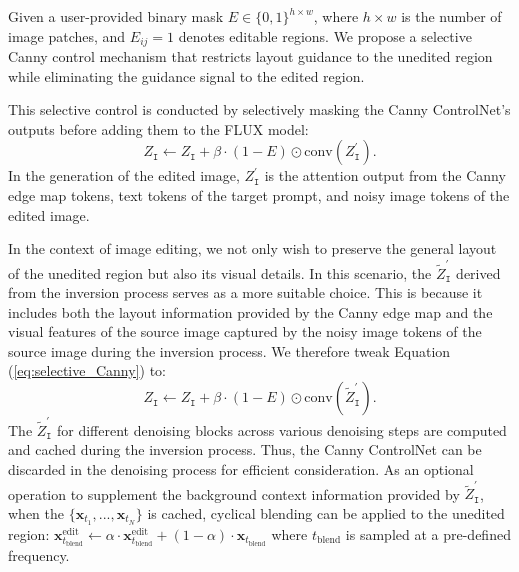 \documentclass{article}
\begin{document}
Given a user-provided binary mask \( E \in \{0,1\}^{h \times w} \), where $h \times w$ is the number of image patches, and \( E_{ij} = 1 \) denotes editable regions.  We propose a selective Canny control mechanism that restricts layout guidance to the unedited region while eliminating the guidance signal to the edited region.

This selective control is conducted by selectively masking the Canny ControlNet's outputs before adding them to the FLUX model:
\begin{equation}
Z_{\texttt{I}} \gets Z_{\texttt{I}} + \beta\cdot (1-E) \odot \mathrm{conv}({Z}^{\prime}_{\texttt{I}}).
\label{eq:selective_Canny}
\end{equation}
In the generation of the edited image, ${Z}^{\prime}_{\texttt{I}}$ is the attention output from the Canny edge map tokens, text tokens of the target prompt, and noisy image tokens of the edited image. 


In the context of image editing, we not only wish to preserve the general layout of the unedited region but also its visual details. In this scenario, the $\tilde{Z}^{\prime}_{\texttt{I}}$ derived from the inversion process serves as a more suitable choice. This is because it includes both the layout information provided by the Canny edge map and the visual features of the source image captured by the noisy image tokens of the source image during the inversion process. We therefore tweak Equation (\ref{eq:selective_Canny}) to:
\begin{equation}
Z_{\texttt{I}} \gets Z_{\texttt{I}} + \beta\cdot (1-E) \odot \mathrm{conv}(\tilde{Z}^{\prime}_{\texttt{I}}).
\label{eq:selective_Canny2}
\end{equation}
The $\tilde{Z}^{\prime}_{\texttt{I}}$ for different denoising blocks across various denoising steps are computed and cached during the inversion process. Thus, the Canny ControlNet can be discarded in the denoising process for efficient consideration. As an optional operation to supplement the background context information provided by $\tilde{Z}^{\prime}_{\texttt{I}}$, when the $\{\mathbf{x}_{t_{1}},...,\mathbf{x}_{t_{N}}\}$ is cached, cyclical blending can be applied to the unedited region:  $\mathbf{x}^\text{edit}_{t_\text{blend}}\gets \alpha\cdot\mathbf{x}^\text{edit}_{t_\text{blend}}+(1-\alpha)\cdot\mathbf{x}_{t_\text{blend}}$ where $t_\text{blend}$ is sampled at a pre-defined frequency.
\end{document}
